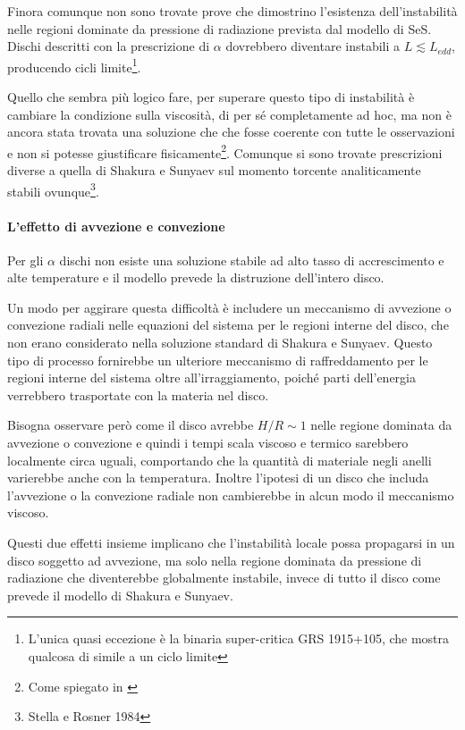 \documentclass[a4paperbi]{article}
\begin{document}
	Finora comunque non sono trovate prove che dimostrino l'esistenza dell'instabilità nelle regioni dominate da pressione di radiazione prevista dal modello di SeS. Dischi descritti con la prescrizione di $\alpha$ dovrebbero diventare instabili a $L\lesssim L_{edd}$, producendo cicli limite\footnote{L'unica quasi eccezione è la binaria super-critica GRS 1915+105, che mostra qualcosa di simile a un ciclo limite}. 
	
	Quello che sembra più logico fare, per superare questo tipo di instabilità è cambiare la condizione sulla viscosità, di per sé completamente ad hoc, ma non è ancora stata trovata una soluzione che che fosse coerente con tutte le osservazioni e non si potesse giustificare fisicamente\footnote{Come spiegato in \cite{Pringle1981}}. Comunque si sono trovate prescrizioni diverse a quella di Shakura e Sunyaev sul momento torcente analiticamente stabili ovunque\footnote{Stella e Rosner 1984}. 
		
	\paragraph{L'effetto di avvezione e convezione}

	Per gli $\alpha$ dischi non esiste una soluzione stabile ad alto tasso di accrescimento e alte temperature e il modello prevede la distruzione dell'intero disco.
	
	Un modo per aggirare questa difficoltà è includere un meccanismo di avvezione o convezione radiali nelle equazioni del sistema per le regioni interne del disco, che non erano considerato nella soluzione standard di Shakura e Sunyaev. Questo tipo di processo fornirebbe un ulteriore meccanismo di raffreddamento per le regioni interne del sistema oltre all'irraggiamento, poiché parti dell'energia verrebbero trasportate con la materia nel disco. 
		
	Bisogna osservare però come il disco avrebbe $H/R\sim1$ nelle regione dominata da avvezione o convezione e quindi i tempi scala viscoso e termico sarebbero localmente circa uguali, comportando che la quantità di materiale negli anelli varierebbe anche con la temperatura. Inoltre l'ipotesi di un disco che includa l'avvezione o la convezione radiale non cambierebbe in alcun modo il meccanismo viscoso. 
	
	Questi due effetti insieme implicano che l'instabilità locale possa propagarsi in un disco soggetto ad avvezione, ma solo nella regione dominata da pressione di radiazione che diventerebbe globalmente instabile, invece di tutto il disco come prevede il modello di Shakura e Sunyaev.
	
\end{document}

